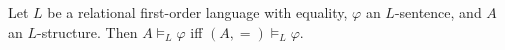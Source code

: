 Let $L$ be a relational first-order language with equality, $\varphi$ an $L$-sentence, and $A$ an $L$-structure. Then $A \models_{L} \varphi$ iff $(A, =) \models_{L} \varphi$.
